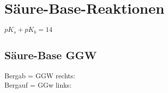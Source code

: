 \section{Säure-Base-Reaktionen}
$pK_{s}+ pK_{b} = 14$
\subsection{Säure-Base GGW}
Bergab = GGW rechts: \\
Bergauf = GGw links: \\



